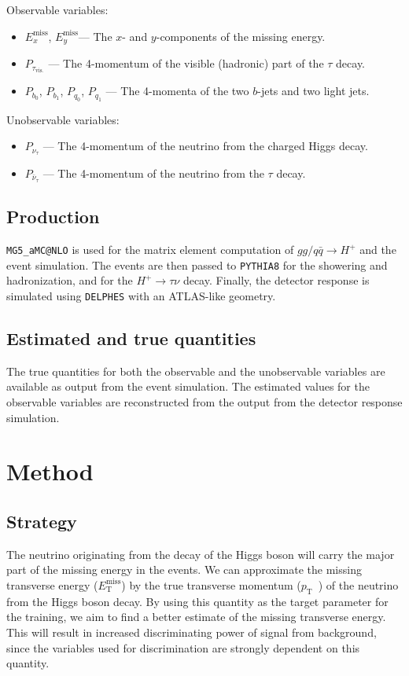 \documentclass[twocolumn]{scrartcl}
\newcommand{\etmiss}{$E_\mathrm{T}^\text{miss}$}
\newcommand{\exmiss}{$E_x^\text{miss}$}
\newcommand{\eymiss}{$E_y^\text{miss}$}
\newcommand{\pt}{\ensuremath{p_\text{T}}~}
\begin{document}
Observable variables:
\begin{itemize}
    \item \exmiss, \eymiss --- The $x$- and $y$-components of the missing energy.
    \item $P_{\tau_\mathrm{vis.}}$ --- The 4-momentum of the visible (hadronic) part of the $\tau$ decay.
    \item $P_{b_0}$, $P_{b_1}$, $P_{q_0}$, $P_{q_1}$ --- The 4-momenta of the two $b$-jets and two light jets.
\end{itemize}

Unobservable variables:
\begin{itemize}
    \item $P_{\nu_\tau}$ --- The 4-momentum of the neutrino from the charged Higgs decay.
    \item $P_{\bar\nu_\tau}$ --- The 4-momentum of the neutrino from the $\tau$ decay.
\end{itemize}

\subsection{Production}
\texttt{MG5\_aMC@NLO} \cite{Alwall:2014hca} is used for the matrix element computation of $gg / q \bar q \to H^+$ and the event simulation. The events are then passed to \texttt{PYTHIA8} \cite{Sjöstrand2015159} for the showering and hadronization, and for the $H^+\to \tau\nu$ decay. Finally, the detector response is simulated using \texttt{DELPHES} \cite{Favereau2014} with an ATLAS-like geometry.

\subsection{Estimated and true quantities}
The true quantities for both the observable and the unobservable variables are available as output from the event simulation. The estimated values for the observable variables are reconstructed from the output from the detector response simulation.

\section{Method}

\subsection{Strategy}
The neutrino originating from the decay of the Higgs boson will carry the major part of the missing energy in the events. We can approximate the missing transverse energy (\etmiss) by the true transverse momentum (\pt) of the neutrino from the Higgs boson decay. By using this quantity as the target parameter for the training, we aim to find a better estimate of the missing transverse energy. This will result in increased discriminating power of signal from background, since the variables used for discrimination are strongly dependent on this quantity.
\end{document}
